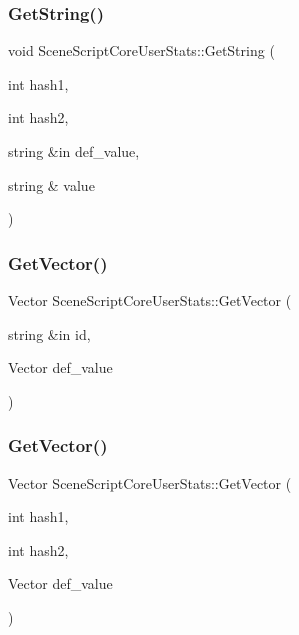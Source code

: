\subsubsection{\texorpdfstring{Get\+String()}{GetString()}\hspace{0.1cm}{\footnotesize\ttfamily [2/2]}}
{\footnotesize\ttfamily void Scene\+Script\+Core\+User\+Stats\+::\+Get\+String (\begin{DoxyParamCaption}\item[{int}]{hash1,  }\item[{int}]{hash2,  }\item[{string \&in}]{def\+\_\+value,  }\item[{string \&}]{value }\end{DoxyParamCaption})}

\hypertarget{class_scene_script_core_user_stats_ad6b1eb13d5a27b1cc9e4cc7b50f83aca}{}\label{class_scene_script_core_user_stats_ad6b1eb13d5a27b1cc9e4cc7b50f83aca} 
\subsubsection{\texorpdfstring{Get\+Vector()}{GetVector()}\hspace{0.1cm}{\footnotesize\ttfamily [1/2]}}
{\footnotesize\ttfamily Vector Scene\+Script\+Core\+User\+Stats\+::\+Get\+Vector (\begin{DoxyParamCaption}\item[{string \&in}]{id,  }\item[{Vector}]{def\+\_\+value }\end{DoxyParamCaption})}

\hypertarget{class_scene_script_core_user_stats_a181e9b1e117c32e17aa3dcecb9083503}{}\label{class_scene_script_core_user_stats_a181e9b1e117c32e17aa3dcecb9083503} 
\subsubsection{\texorpdfstring{Get\+Vector()}{GetVector()}\hspace{0.1cm}{\footnotesize\ttfamily [2/2]}}
{\footnotesize\ttfamily Vector Scene\+Script\+Core\+User\+Stats\+::\+Get\+Vector (\begin{DoxyParamCaption}\item[{int}]{hash1,  }\item[{int}]{hash2,  }\item[{Vector}]{def\+\_\+value }\end{DoxyParamCaption})}

